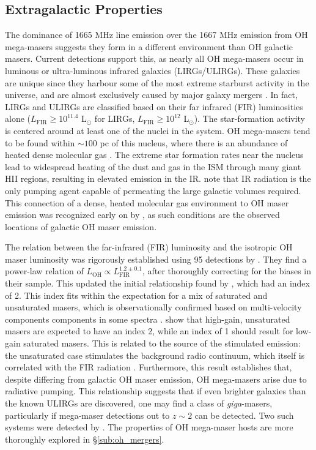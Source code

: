 \subsection{Extragalactic Properties}
\label{sub:oh_gal_props}

The dominance of 1665 MHz line emission over the 1667 MHz emission from OH mega-masers suggests they form in a different environment than OH galactic masers. Current detections support this, as nearly all OH mega-masers occur in luminous or ultra-luminous infrared galaxies (LIRGs/ULIRGs). These galaxies are unique since they harbour some of the most extreme starburst activity in the universe, and are almost exclusively caused by major galaxy mergers \citep{clements1996}. In fact, LIRGs and ULIRGs are classified based on their far infrared (FIR) luminosities alone ($L_{\mathrm{FIR}} \ge 10^{11.4}$ L$_{\odot}$ for LIRGs, $L_{\mathrm{FIR}} \ge 10^{12}$ L$_{\odot}$).  The star-formation activity is centered around at least one of the nuclei in the system. OH mega-masers tend to be found within $\sim 100$ pc of this nucleus, where there is an abundance of heated dense molecular gas \citep{lo2005}. The extreme star formation rates near the nucleus lead to widespread heating of the dust and gas in the ISM through many giant HII regions, resulting in elevated emission in the IR. \citet{Elitzur_1992} note that IR radiation is the only pumping agent capable of permeating the large galactic volumes required. This connection of a dense, heated molecular gas environment to OH maser emission was recognized early on by \citet{Bottinelli_1987}, as such conditions are the observed locations of galactic OH maser emission. 

The relation between the far-infrared (FIR) luminosity and the isotropic OH maser luminosity was rigorously established using 95 detections by \citet{darling2002_paperIII}. They find a power-law relation of $L_{\mathrm{OH}} \propto L_{\mathrm{FIR}}^{1.2\pm0.1}$, after thoroughly correcting for the biases in their sample. This updated the initial relationship found by \cite{Baan_1989}, which had an index of 2.  This index fits within the expectation for a mix of saturated and unsaturated masers, which is observationally confirmed based on multi-velocity components components in some spectra . \citet{darling2002_paperIII} show that high-gain, unsaturated masers are expected to have an index 2, while an index of 1 should result for low-gain saturated masers. This is related to the source of the stimulated emission: the unsaturated case stimulates the background radio continuum, which itself is correlated with the FIR radiation \citep{Yun_2001}. Furthermore, this result establishes that, despite differing from galactic OH maser emission, OH mega-masers arise due to radiative pumping. This relationship suggests that if even brighter galaxies than the known ULIRGs are discovered, one may find a class of {\it giga}-masers, particularly if mega-maser detections out to $z\sim 2$ can be detected.  Two such systems were detected by \citet{darling2002_paperIII}.  The properties of OH mega-maser hosts are more thoroughly explored in \S\ref{sub:oh_mergers}.

